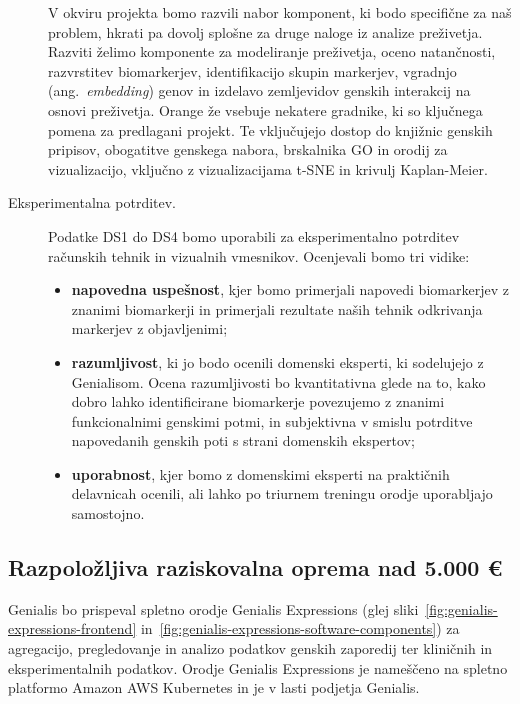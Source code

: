 \documentclass[11pt,a4paper]{article}
\renewcommand{\bold}{\textbf}
\begin{document}
\begin{description}
	V okviru projekta bomo razvili nabor komponent, ki bodo specifične za naš problem, hkrati pa dovolj splošne za druge naloge iz analize preživetja. Razviti želimo komponente za modeliranje preživetja, oceno natančnosti, razvrstitev biomarkerjev, identifikacijo skupin markerjev, vgradnjo (ang.~{\em embedding}) genov in izdelavo zemljevidov genskih interakcij na osnovi preživetja. Orange že vsebuje nekatere gradnike, ki so ključnega pomena za predlagani projekt. Te vključujejo dostop do knjižnic genskih pripisov, obogatitve genskega nabora, brskalnika GO in orodij za vizualizacijo, vključno z vizualizacijama t-SNE in krivulj Kaplan-Meier.

	\item[Eksperimentalna potrditev.] Podatke DS1 do DS4 bomo uporabili za eksperimentalno potrditev računskih tehnik in vizualnih vmesnikov. Ocenjevali bomo tri vidike:
	\begin{itemize}
		\item \bold{napovedna uspešnost}, kjer bomo primerjali napovedi biomarkerjev z znanimi biomarkerji in primerjali rezultate naših tehnik odkrivanja markerjev z objavljenimi;
		\item \bold{razumljivost}, ki jo bodo ocenili domenski eksperti, ki sodelujejo z Genialisom.
Ocena razumljivosti bo kvantitativna glede na to, kako dobro lahko identificirane biomarkerje povezujemo z znanimi funkcionalnimi genskimi potmi, in subjektivna v smislu potrditve napovedanih genskih poti s strani domenskih ekspertov;
		\item \bold{uporabnost}, kjer bomo z domenskimi eksperti na praktičnih delavnicah ocenili, ali lahko po triurnem treningu orodje uporabljajo samostojno.
	\end{itemize}
\end{description}

\subsection{Razpoložljiva raziskovalna oprema nad 5.000 €}

Genialis bo prispeval spletno orodje Genialis Expressions (glej sliki~\ref{fig:genialis-expressions-frontend} in~\ref{fig:genialis-expressions-software-components}) za agregacijo, pregledovanje in analizo podatkov genskih zaporedij ter kliničnih in eksperimentalnih podatkov. Orodje Genialis Expressions je nameščeno na spletno platformo Amazon AWS Kubernetes in je v lasti podjetja Genialis.
\end{document}
